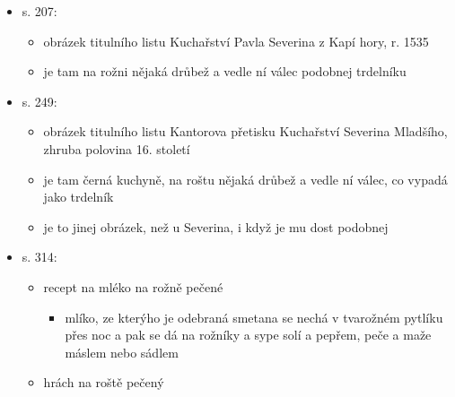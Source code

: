 \begin{itemize}
\begin{itemize}
    \begin{itemize}
    \tightlist
    \item
      Dictionarius trium linguarum, latinae, teutonicae, boemicae
      potiora vocabula continens, peregrinantibus apprime utilis,
      Viennae, 1513, 4°; ve Varšavě, 1513, 4°; vydání 1532, 12°.
    \item
      tady je
      \href{https://dbc.wroc.pl/dlibra/publication/33643/edition/30385/content?ref=L3B1YmxpY2F0aW9uLzM0Njg5L2VkaXRpb24vMzE0MTQ}{digitalizovaná
      verze}, s. 19
    \item
      Ouarium - wagečznik - eyerkuch
    \end{itemize}
  \item
    s. 207:

    \begin{itemize}
    \tightlist
    \item
      obrázek titulního listu Kuchařství Pavla Severina z Kapí hory, r.
      1535
    \item
      je tam na rožni nějaká drůbež a vedle ní válec podobnej trdelníku
    \end{itemize}
  \item
    s. 249:

    \begin{itemize}
    \tightlist
    \item
      obrázek titulního listu Kantorova přetisku Kuchařství Severina
      Mladšího, zhruba polovina 16. století
    \item
      je tam černá kuchyně, na roštu nějaká drůbež a vedle ní válec, co
      vypadá jako trdelník
    \item
      je to jinej obrázek, než u Severina, i když je mu dost podobnej
    \end{itemize}
  \item
    s. 314:

    \begin{itemize}
    \tightlist
    \item
      recept na mléko na rožně pečené

      \begin{itemize}
      \tightlist
      \item
        mlíko, ze kterýho je odebraná smetana se nechá v tvarožném
        pytlíku přes noc a pak se dá na rožníky a sype solí a pepřem,
        peče a maže máslem nebo sádlem
      \end{itemize}
    \item
      hrách na roště pečený


\end{itemize}
\end{itemize}
\end{itemize}
